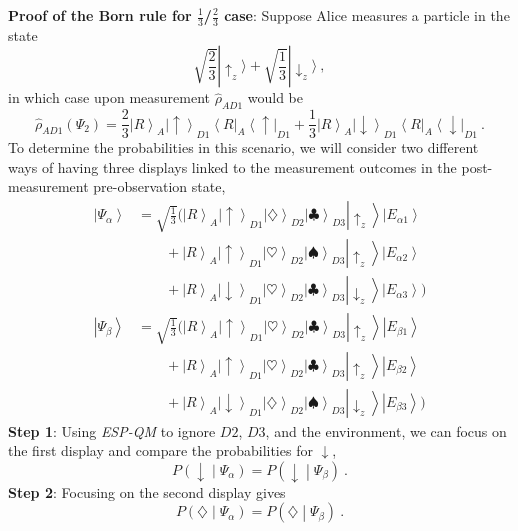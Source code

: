 \documentclass[12pt,onecolumn,secnumarabic,amsmath,amssymb,balancelastpage,nofootinbib]{article}
\newcommand{\bra}[1]{\ensuremath{\left\langle#1\right|}}
\newcommand{\ket}[1]{\ensuremath{\left|#1\right\rangle}}
\begin{document}
\textbf{Proof of the Born rule for $\frac{1}{3}$/$\frac{2}{3}$ case}:  Suppose Alice measures a particle in the state
\begin{equation}
\sqrt{\frac{2}{3}}|\uparrow_z\rangle+\sqrt{\frac{1}{3}}|\downarrow_z\rangle\ ,
\end{equation}
in which case upon measurement $\widehat{\rho}_{AD1}$ would be
\begin{equation}
\widehat{\rho}_{AD1}\left(\Psi_2\right)=\frac{2}{3}\ket{R}_A\ket{\uparrow}_{D1}\bra{R}_A\bra{\uparrow}_{D1}+\frac{1}{3}\ket{R}_A\ket{\downarrow}_{D1}\bra{R}_A\bra{\downarrow}_{D1}\ .
\label{23reduced}
\end{equation}
To determine the probabilities in this scenario, we will consider two different ways of having three displays linked to the measurement outcomes in the post-measurement pre-observation state,
\begin{align} \ket{\Psi_\alpha}&=\sqrt{\frac{1}{3}}\Big(\ket{R}_A\ket{\uparrow}_{D1}\ket{\diamondsuit}_{D2}\ket{\clubsuit}_{D3}\ket{\uparrow_z}\ket{E_{\alpha 1}}\nonumber\\
&\qquad+\ket{R}_A\ket{\uparrow}_{D1}\ket{\heartsuit}_{D2}\ket{\spadesuit}_{D3}\ket{\uparrow_z}\ket{E_{\alpha 2}}
\nonumber
\\
&\qquad
+\ket{R}_A\ket{\downarrow}_{D1}\ket{\heartsuit}_{D2}\ket{\clubsuit}_{D3}\ket{\downarrow_z}\ket{E_{\alpha 3}}\Big)
\nonumber
\\
\ket{\Psi_\beta}&=\sqrt{\frac{1}{3}}\Big(\ket{R}_A\ket{\uparrow}_{D1}\ket{\heartsuit}_{D2}\ket{\clubsuit}_{D3}\ket{\uparrow_z}\ket{E_{\beta 1}}\nonumber\\
&\qquad+\ket{R}_A\ket{\uparrow}_{D1}\ket{\heartsuit}_{D2}\ket{\clubsuit}_{D3}\ket{\uparrow_z}\ket{E_{\beta 2}}
\nonumber
\\
&\qquad+\ket{R}_A\ket{\downarrow}_{D1}\ket{\diamondsuit}_{D2}\ket{\spadesuit}_{D3}\ket{\downarrow_z}\ket{E_{\beta 3}}\Big)
\label{alphaandbetastates}
\end{align}
\textbf{Step 1}:  Using \emph{ESP-QM} to ignore $D2$, $D3$, and the environment, we can focus on the first display and compare the probabilities for $\downarrow$,
\begin{equation}
P\left(\downarrow\middle|\Psi_\alpha\right)=P\left(\downarrow\middle|\Psi_\beta\right)\ .
\label{ss1}
\end{equation}
\textbf{Step 2}:  Focusing on the second display gives
\begin{equation}
P\left(\diamondsuit\middle|\Psi_\alpha\right)=P\left(\diamondsuit\middle|\Psi_\beta\right)\ . 
\label{ss15}
\end{equation}
\end{document}
